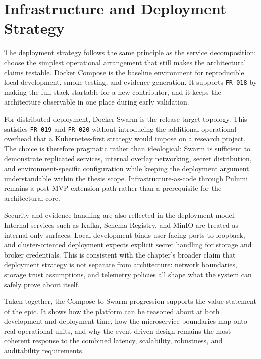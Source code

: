 \section{Infrastructure and Deployment Strategy}
\label{sec:infrastructure}

The deployment strategy follows the same principle as the service decomposition: choose the simplest operational arrangement that still makes the architectural claims testable. Docker Compose is the baseline environment for reproducible local development, smoke testing, and evidence generation. It supports \texttt{FR-018} by making the full stack startable for a new contributor, and it keeps the architecture observable in one place during early validation.

For distributed deployment, Docker Swarm is the release-target topology. This satisfies \texttt{FR-019} and \texttt{FR-020} without introducing the additional operational overhead that a Kubernetes-first strategy would impose on a research project. The choice is therefore pragmatic rather than ideological: Swarm is sufficient to demonstrate replicated services, internal overlay networking, secret distribution, and environment-specific configuration while keeping the deployment argument understandable within the thesis scope. Infrastructure-as-code through Pulumi remains a post-MVP extension path rather than a prerequisite for the architectural core.

Security and evidence handling are also reflected in the deployment model. Internal services such as Kafka, Schema Registry, and MinIO are treated as internal-only surfaces. Local development binds user-facing ports to loopback, and cluster-oriented deployment expects explicit secret handling for storage and broker credentials. This is consistent with the chapter's broader claim that deployment strategy is not separate from architecture: network boundaries, storage trust assumptions, and telemetry policies all shape what the system can safely prove about itself.

Taken together, the Compose-to-Swarm progression supports the value statement of the epic. It shows how the platform can be reasoned about at both development and deployment time, how the microservice boundaries map onto real operational units, and why the event-driven design remains the most coherent response to the combined latency, scalability, robustness, and auditability requirements.
